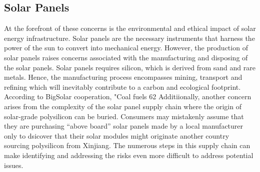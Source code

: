 \documentclass[10pt,twocolumn]{article}
\begin{document}
\subsection{Solar Panels}
At the forefront of these concerns is the environmental and ethical impact of solar energy infrastructure. Solar panels are the necessary instruments that harness the power of the sun to convert into mechanical energy. However, the production of solar panels raises concerns associated with the manufacturing and disposing of the solar panels. Solar panels requires silicon, which is derived from sand  and rare metals. Hence, the manufacturing process encompasses mining, transport and refining which will inevitably contribute to a carbon and ecological footprint. According to BigSolar cooperation, "Coal fuels 62%
Additiionally, another concern arises from the complexity of the solar panel supply chain where the origin of solar-grade polysilicon can be buried. Consumers may mistakenly assume that they are purchasing “above board” solar panels made by a local manufacturer only to dsicover that their solar modules might originate another country sourcing polysilicon from Xinjiang. The numerous steps in this supply chain can make identifying and addressing the risks even more difficult to address potential issues. 
\end{document}

